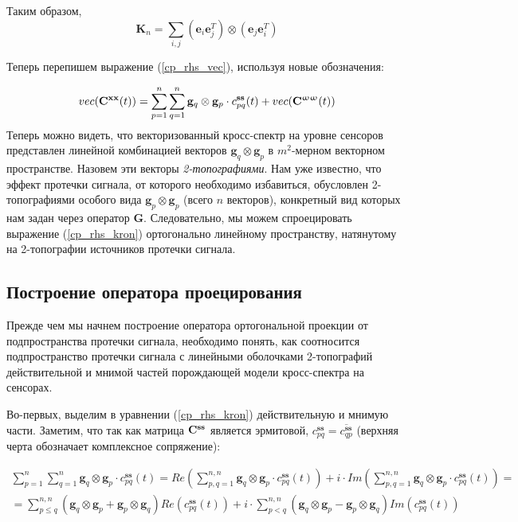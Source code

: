 Таким образом,
\begin{equation}
    \mathbf{K}_n =  \sum_{i,j} (\mathbf{e}_i \mathbf{e}_j^T) \otimes (\mathbf{e}_j \mathbf{e}_i^T)
    \label{eq:commutation_matrix_formula}
\end{equation}

Теперь перепишем выражение (\ref{cp_rhs_vec}), используя новые обозначения:

\begin{equation}
    vec(\mathbf{C}^{\mathbf{x x}}(t)) = \sum\limits_{p=1}^n\sum\limits_{q=1}^n
    \mathbf{g}_q\otimes \mathbf{g}_p \cdot c_{pq}^{\mathbf{ss}}(t) + vec(\mathbf{C}^{\mathbf{\upomega \upomega}}(t))
    \label{cp_rhs_kron}
\end{equation}
Теперь можно видеть, что векторизованный кросс-спектр на уровне сенсоров представлен линейной
комбинацией векторов $\mathbf{g}_q \otimes \mathbf{g}_p$ в $m^2$-мерном векторном пространстве.
Назовем эти векторы \emph{2-топографиями}.
Нам уже известно, что эффект протечки сигнала, от которого необходимо избавиться,
обусловлен 2-топографиями особого вида $\mathbf{g}_p \otimes \mathbf{g}_p$ (всего $n$ векторов),
конкретный вид которых нам задан через оператор $\mathbf{G}$.
Следовательно, мы можем спроецировать выражение (\ref{cp_rhs_kron}) ортогонально линейному пространству,
натянутому на 2-топографии источников протечки сигнала.

\subsection{Построение оператора проецирования}
Прежде чем мы начнем построение оператора ортогональной проекции от подпространства протечки сигнала,
необходимо понять, как соотносится подпространство протечки сигнала с линейными оболочками
2-топографий действительной и мнимой частей порождающей модели кросс-спектра на сенсорах.

Во-первых, выделим в уравнении (\ref{cp_rhs_kron}) действительную и мнимую части.
Заметим, что так как матрица $\mathbf{C}^{\mathbf{s s}}$ является эрмитовой,
$c^{\mathbf{ss}}_{pq} = \overline{c^{\mathbf{ss}}_{qp}}$ (верхняя черта обозначает комплексное сопряжение):

\begin{gather}
    \sum\limits_{p=1}^n\sum\limits_{q=1}^n \mathbf{g}_q\otimes \mathbf{g}_p \cdot c_{pq}^{\mathbf{ss}}(t) =
    Re\left(\sum\limits_{p,q=1}^{n,n} \mathbf{g}_q\otimes \mathbf{g}_p \cdot c_{pq}^{\mathbf{ss}}(t)\right) +
     i \cdot Im\left(\sum\limits_{p,q=1}^{n,n}
     \mathbf{g}_q\otimes \mathbf{g}_p \cdot c_{pq}^{\mathbf{ss}}(t)\right) = \nonumber \\
           = \sum\limits_{p\leq q}^{n,n} (\mathbf{g}_q\otimes \mathbf{g}_p + \mathbf{g}_p\otimes \mathbf{g}_q)
           Re\left(c_{pq}^{\mathbf{ss}}(t)\right) +
     i \cdot \sum\limits_{p<q}^{n,n} (\mathbf{g}_q\otimes \mathbf{g}_p - \mathbf{g}_p\otimes \mathbf{g}_q)
           Im\left(c_{pq}^{\mathbf{ss}}(t)\right)
    \label{eq:cp_re_im}
\end{gather}

